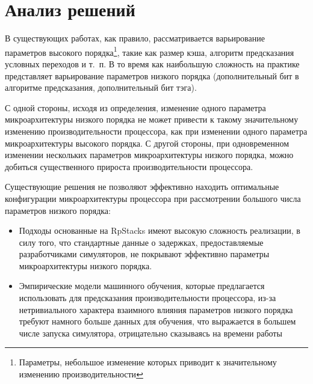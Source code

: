 \section{Анализ решений}

В существующих работах, как правило, рассматривается варьирование параметров высокого порядка\footnote{Параметры, небольшое изменение которых приводит к значительному изменению производительности}, такие как размер кэша, алгоритм предсказания условных переходов и т.~п. В то время как наибольшую сложность на практике представляет варьирование параметров низкого порядка (дополнительный бит в алгоритме предсказания, дополнительный бит тэга).

С одной стороны, исходя из определения, изменение одного параметра микроархитектуры низкого порядка не может привести к такому значительному изменению производительности процессора, как при изменении одного параметра микроархитектуры высокого порядка. С другой стороны, при одновременном изменении нескольких параметров микроархитектуры низкого порядка, можно добиться существенного прироста производительности процессора.

Существующие решения не позволяют эффективно находить оптимальные конфигурации микроархитектуры процессора при рассмотрении большого числа параметров низкого порядка:
\begin{itemize}
  \item Подходы основанные на RpStacks имеют высокую сложность реализации, в силу того, что стандартные данные о задержках, предоставляемые разработчиками симуляторов, не покрывают эффективно параметры микроархитектуры низкого порядка.
  \item Эмпирические модели машинного обучения, которые предлагается использовать для предсказания производительности процессора, из-за нетривиального характера взаимного влияния параметров низкого порядка требуют намного больше данных для обучения, что выражается в большем числе запуска симулятора, отрицательно сказываясь на времени работы
\end{itemize}
